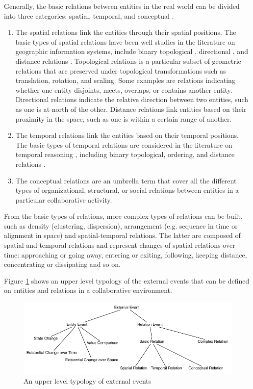 Generally, the basic relations between entities in the real world can be divided into three categories: spatial, temporal, and conceptual \cite{Tomaszewski2010}.

\begin{enumerate}
	\item The spatial relations link the entities through their spatial positions. The basic types of spatial relations have been well studies in the literature on geographic information systems, include binary topological \cite{egenhofer1994deriving}, directional \cite{frank1991qualitative}, and distance relations \cite{hernandez1995qualitative}. Topological relations is a particular subset of geometric relations that are preserved under topological transformations such as translation, rotation, and scaling. Some examples are relations indicating whether one entity disjoints, meets, overlaps, or contains another entity. Directional relations indicate the relative direction between two entities, such as one is at north of the other. Distance relations link entities based on their proximity in the space, such as one is within a certain range of another. 
	\item The temporal relations link the entities based on their temporal positions. The basic types of temporal relations are considered in the literature on temporal reasoning \cite{allen1994actions}, including binary topological, ordering, and distance relations \cite{Andrienko2011}.
	\item The conceptual relations are an umbrella term that cover all the different types of organizational, structural, or social relations between entities in a particular collaborative activity. 
\end{enumerate}

From the basic types of relations, more complex types of relations can be built, such as
density (clustering, dispersion), arrangement (e.g. sequence in time or alignment in space) and spatial-temporal relations. The latter are composed of spatial and temporal relations and represent changes of spatial relations over time: approaching or going away, entering or exiting, following, keeping distance, concentrating or dissipating and so on.

Figure \ref{fig:external_events} shows an upper level typology of the external events that can be defined on entities and relations in a collaborative environment.
\begin{figure}[htbp] %
	\centering
	\includegraphics{external_events.pdf} 
	\caption{An upper level typology of external events}
	\label{fig:external_events}
\end{figure}

